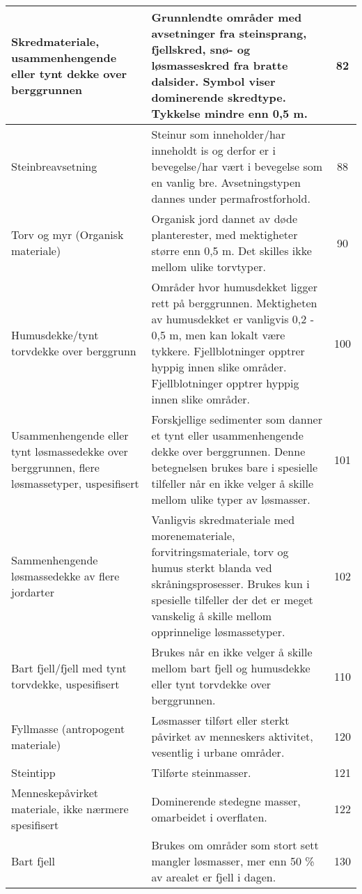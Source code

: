 \begin{longtable}{|p{3.5cm}|p{6.2cm}|c|}
    Skredmateriale, usammenhengende eller tynt dekke over berggrunnen & Grunnlendte områder med avsetninger fra steinsprang, fjellskred, snø- og løsmasseskred fra bratte dalsider. Symbol viser dominerende skredtype. Tykkelse mindre enn 0,5 m. & 82 \\ \hline
    Steinbreavsetning & Steinur som inneholder/har inneholdt is og derfor er i bevegelse/har vært i bevegelse som en vanlig bre. Avsetningstypen dannes under permafrostforhold. & 88 \\ \hline
    Torv og myr (Organisk materiale) & Organisk jord dannet av døde planterester, med mektigheter større enn 0,5 m. Det skilles ikke mellom ulike torvtyper. & 90 \\ \hline
    Humusdekke/tynt torvdekke over berggrunn & Områder hvor humusdekket ligger rett på berggrunnen. Mektigheten av humusdekket er vanligvis 0,2 - 0,5 m, men kan lokalt være tykkere. Fjellblotninger opptrer hyppig innen slike områder. Fjellblotninger opptrer hyppig innen slike områder. & 100 \\ \hline
    Usammenhengende eller tynt løsmassedekke over berggrunnen, flere løsmassetyper, uspesifisert & Forskjellige sedimenter som danner et tynt eller usammenhengende dekke over berggrunnen. Denne betegnelsen brukes bare i spesielle tilfeller når en ikke velger å skille mellom ulike typer av løsmasser. & 101 \\ \hline
    Sammenhengende løsmassedekke av flere jordarter & Vanligvis skredmateriale med morenemateriale, forvitringsmateriale, torv og humus sterkt blanda ved skråningsprosesser. Brukes kun i spesielle tilfeller der det er meget vanskelig å skille mellom opprinnelige løsmassetyper. & 102 \\ \hline
    Bart fjell/fjell med tynt torvdekke, uspesifisert & Brukes når en ikke velger å skille mellom bart fjell og humusdekke eller tynt torvdekke over berggrunnen. & 110 \\ \hline
    Fyllmasse (antropogent materiale) & Løsmasser tilført eller sterkt påvirket av menneskers aktivitet, vesentlig i urbane områder. & 120 \\ \hline
    Steintipp & Tilførte steinmasser. & 121 \\ \hline
    Menneskepåvirket materiale, ikke nærmere spesifisert & Dominerende stedegne masser, omarbeidet i overflaten. & 122 \\ \hline
    Bart fjell & Brukes om områder som stort sett mangler løsmasser, mer enn 50 \% av arealet er fjell i dagen. & 130 \\ \hline

\end{longtable}
